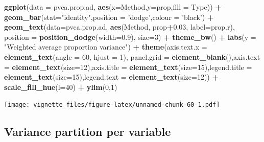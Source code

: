 \documentclass[]{book}
\newenvironment{Shaded}{\begin{snugshade}}{\end{snugshade}}
\newcommand{\KeywordTok}[1]{\textcolor[rgb]{0.13,0.29,0.53}{\textbf{#1}}}
\newcommand{\DataTypeTok}[1]{\textcolor[rgb]{0.13,0.29,0.53}{#1}}
\newcommand{\DecValTok}[1]{\textcolor[rgb]{0.00,0.00,0.81}{#1}}
\newcommand{\FloatTok}[1]{\textcolor[rgb]{0.00,0.00,0.81}{#1}}
\newcommand{\StringTok}[1]{\textcolor[rgb]{0.31,0.60,0.02}{#1}}
\newcommand{\OperatorTok}[1]{\textcolor[rgb]{0.81,0.36,0.00}{\textbf{#1}}}
\newcommand{\NormalTok}[1]{#1}
\begin{document}
\begin{Shaded}
\begin{Highlighting}[]
\KeywordTok{ggplot}\NormalTok{(}\DataTypeTok{data =}\NormalTok{ pvca.prop.ad, }\KeywordTok{aes}\NormalTok{(}\DataTypeTok{x=}\NormalTok{Method,}\DataTypeTok{y=}\NormalTok{prop,}\DataTypeTok{fill =}\NormalTok{ Type)) }\OperatorTok{+}\StringTok{ }\KeywordTok{geom_bar}\NormalTok{(}\DataTypeTok{stat=}\StringTok{"identity"}\NormalTok{,}\DataTypeTok{position =} \StringTok{'dodge'}\NormalTok{,}\DataTypeTok{colour =} \StringTok{'black'}\NormalTok{) }\OperatorTok{+}\StringTok{ }\KeywordTok{geom_text}\NormalTok{(}\DataTypeTok{data=}\NormalTok{pvca.prop.ad, }\KeywordTok{aes}\NormalTok{(Method, prop}\OperatorTok{+}\FloatTok{0.03}\NormalTok{, }\DataTypeTok{label=}\NormalTok{prop.r), }\DataTypeTok{position =} \KeywordTok{position_dodge}\NormalTok{(}\DataTypeTok{width=}\FloatTok{0.9}\NormalTok{), }\DataTypeTok{size=}\DecValTok{3}\NormalTok{) }\OperatorTok{+}\StringTok{ }\KeywordTok{theme_bw}\NormalTok{() }\OperatorTok{+}\StringTok{ }\KeywordTok{labs}\NormalTok{(}\DataTypeTok{y =} \StringTok{"Weighted average proportion variance"}\NormalTok{) }\OperatorTok{+}\StringTok{ }\KeywordTok{theme}\NormalTok{(}\DataTypeTok{axis.text.x =} \KeywordTok{element_text}\NormalTok{(}\DataTypeTok{angle =} \DecValTok{60}\NormalTok{, }\DataTypeTok{hjust =} \DecValTok{1}\NormalTok{), }\DataTypeTok{panel.grid =} \KeywordTok{element_blank}\NormalTok{(),}\DataTypeTok{axis.text =} \KeywordTok{element_text}\NormalTok{(}\DataTypeTok{size=}\DecValTok{12}\NormalTok{),}\DataTypeTok{axis.title =} \KeywordTok{element_text}\NormalTok{(}\DataTypeTok{size=}\DecValTok{15}\NormalTok{),}\DataTypeTok{legend.title =} \KeywordTok{element_text}\NormalTok{(}\DataTypeTok{size=}\DecValTok{15}\NormalTok{),}\DataTypeTok{legend.text =} \KeywordTok{element_text}\NormalTok{(}\DataTypeTok{size=}\DecValTok{12}\NormalTok{)) }\OperatorTok{+}\StringTok{ }\KeywordTok{scale_fill_hue}\NormalTok{(}\DataTypeTok{l=}\DecValTok{40}\NormalTok{) }\OperatorTok{+}\StringTok{ }\KeywordTok{ylim}\NormalTok{(}\DecValTok{0}\NormalTok{,}\DecValTok{1}\NormalTok{)}
\end{Highlighting}
\end{Shaded}

\texttt{[image: vignette\_files/figure-latex/unnamed-chunk-60-1.pdf]}

\subsection{Variance partition per
variable}\label{variance-partition-per-variable}
\end{document}
